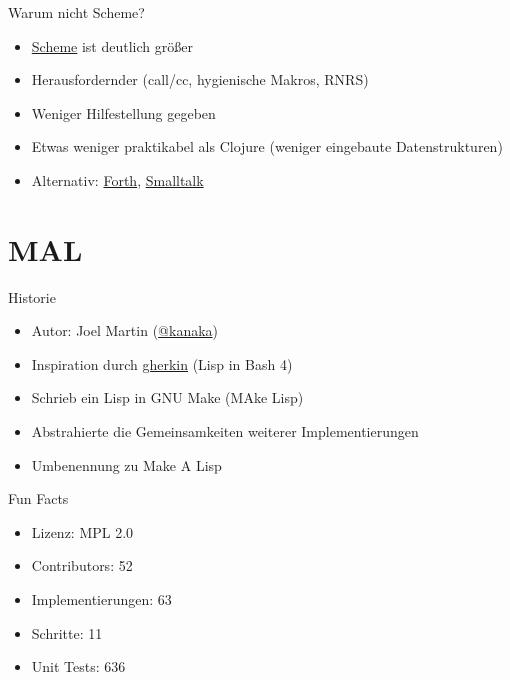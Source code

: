 \documentclass[presentation]{beamer}
\begin{document}
\begin{frame}[label=sec-1-4]{Warum nicht Scheme?}
\begin{itemize}
\item \href{http://schemers.org/}{Scheme} ist deutlich größer
\item Herausfordernder (call/cc, hygienische Makros, RNRS)
\item Weniger Hilfestellung gegeben
\item Etwas weniger praktikabel als Clojure (weniger eingebaute Datenstrukturen)
\item Alternativ: \href{http://thinking-forth.sourceforge.net/}{Forth}, \href{http://pharo.org/}{Smalltalk}
\end{itemize}
\end{frame}

\section{MAL}
\label{sec-2}

\begin{frame}[label=sec-2-1]{Historie}
\begin{itemize}
\item Autor: Joel Martin (\href{https://github.com/kanaka}{@kanaka})
\item Inspiration durch \href{https://github.com/alandipert/gherkin}{gherkin} (Lisp in Bash 4)
\item Schrieb ein Lisp in GNU Make (MAke Lisp)
\item Abstrahierte die Gemeinsamkeiten weiterer Implementierungen
\item Umbenennung zu Make A Lisp
\end{itemize}
\end{frame}

\begin{frame}[label=sec-2-2]{Fun Facts}
\begin{itemize}
\item Lizenz: MPL 2.0
\item Contributors: 52
\item Implementierungen: 63
\item Schritte: 11
\item Unit Tests: 636
\end{itemize}
\end{frame}
\end{document}
